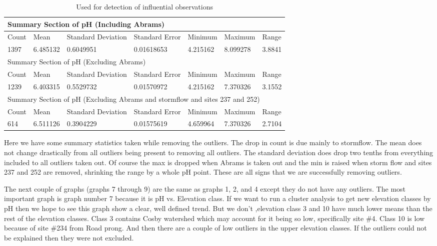 \documentclass[11pt]{article} %
\begin{document}
\begin{table}[htbp]
\caption{Used for detection of influential observations}
\begin{tabular}{lllllll}
\toprule
\multicolumn{7}{l}{Summary Section of pH (Including Abrams)}  \\ 
\midrule
Count & Mean & Standard Deviation & Standard Error & Minimum & Maximum & Range \\ 
1397 & 6.485132 &0.6049951 & 0.01618653 &4.215162 & 8.099278 & 3.8841 \\ 
\midrule
\multicolumn{7}{l}{Summary Section of pH (Excluding Abrams)} \\ 
\midrule
Count & Mean & Standard Deviation & Standard Error & Minimum & Maximum & Range \\ 
1239 & 6.403315 & 0.5529732 & 0.01570972 & 4.215162 & 7.370326 & 3.1552 \\ 
\midrule
\multicolumn{7}{l}{Summary Section of pH (Excluding Abrams and stormflow and sites 237 and 252)}\\ 
\midrule
Count & Mean & Standard Deviation & Standard Error & Minimum & Maximum & Range \\ 
614 & 6.511126 & 0.3904229 & 0.01575619 & 4.659964 &7.370326 & 2.7104 \\ 
\bottomrule
\end{tabular}
\label{Data Summary}
\end{table}


Here we have some summary statistics taken while removing the outliers.  The drop in count is due mainly to stormflow.  The mean does not change drastically from all outliers being present to removing all outliers.  The standard deviation does drop two tenths from everything included to all outliers taken out.  Of course the max is dropped when Abrams is taken out and the min is raised when storm flow and sites 237 and 252 are removed, shrinking the range by a whole pH point.  These are all signs that we are successfully removing outliers. 
	
The next couple of graphs (graphs 7 through 9) are the same as graphs 1, 2, and 4 except they do not have any outliers.  The most important graph is graph number 7 because it is pH vs. Elevation class.  If we want to run a cluster analysis to get new elevation classes by pH then we hope to see this graph show a clear, well defined trend.  But we don't ,elevation class 3 and 10 have much lower means than the rest of the elevation classes.  Class 3 contains Cosby watershed which may account for it being so low, specifically site $\#$4.  Class 10 is low because of site $\#$234 from Road prong.  And then there are a couple of low outliers in the upper elevation classes.  If the outliers could not be explained then they were not excluded.
\end{document}
